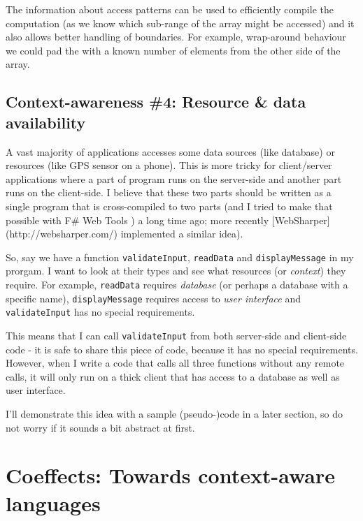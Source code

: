 The information about access patterns can be used to efficiently compile the computation
(as we know which sub-range of the array might be accessed) and it also allows better handling
of boundaries. For example, wrap-around behaviour we could pad the  with a known
number of elements from the other side of the array.


\subsection{Context-awareness \#4: Resource \& data availability}

A vast majority of applications accesses some data sources (like database) or resources
(like GPS sensor on a phone). This is more tricky for client/server applications where a part
of program runs on the server-side and another part runs on the client-side. I believe that 
these two parts should be written as a single program that is cross-compiled to two parts 
(and I tried to make that possible with F\# Web Tools \cite{xx})
a long time ago; more recently [WebSharper](http://websharper.com/) implemented a similar idea).

So, say we have a function \texttt{validateInput}, \texttt{readData} and \texttt{displayMessage} in my prorgam.
I want to look at their types and see what resources (or \emph{context}) they require. For example,
\texttt{readData} requires \emph{database} (or perhaps a database with a specific name), \texttt{displayMessage} 
requires access to \emph{user interface} and \texttt{validateInput} has no special requirements.

This means that I can call \texttt{validateInput} from both server-side and client-side code - it is
safe to share this piece of code, because it has no special requirements. However, when I write
a code that calls all three functions without any remote calls, it will only run on a thick
client that has access to a database as well as user interface.

I'll demonstrate this idea with a sample (pseudo-)code in a later section, so do not worry if
it sounds a bit abstract at first.


\section{Coeffects: Towards context-aware languages}

